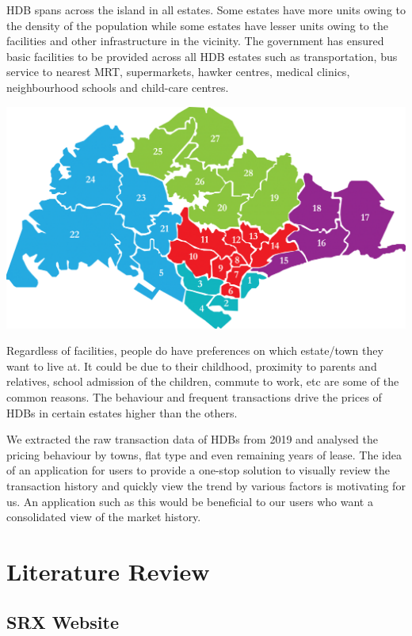 \documentclass{acm_proc_article-sp}
\begin{document}
HDB spans across the island in all estates. Some estates have more units
owing to the density of the population while some estates have lesser
units owing to the facilities and other infrastructure in the vicinity.
The government has ensured basic facilities to be provided across all
HDB estates such as transportation, bus service to nearest MRT,
supermarkets, hawker centres, medical clinics, neighbourhood schools and
child-care centres.

\includegraphics{IMG/img16.png}

Regardless of facilities, people do have preferences on which
estate/town they want to live at. It could be due to their childhood,
proximity to parents and relatives, school admission of the children,
commute to work, etc are some of the common reasons. The behaviour and
frequent transactions drive the prices of HDBs in certain estates higher
than the others.

We extracted the raw transaction data of HDBs from 2019 and analysed the
pricing behaviour by towns, flat type and even remaining years of lease.
The idea of an application for users to provide a one-stop solution to
visually review the transaction history and quickly view the trend by
various factors is motivating for us. An application such as this would
be beneficial to our users who want a consolidated view of the market
history.

\hypertarget{literature-review}{%
\section{Literature Review}\label{literature-review}}

\hypertarget{srx-website}{%
\subsection{SRX Website}\label{srx-website}}
\end{document}
